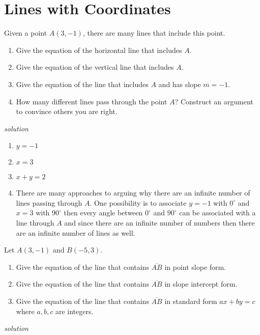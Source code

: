 \documentclass{amsbook}
\begin{document}
\section{Lines with Coordinates}
\begin{Exercise}[title={A point $(x,y)$} ,difficulty=0 ,label=3a1 ]
Given a point $A(3,-1)$, there are many lines that include this point.
	\begin{enumerate}
		\item Give the equation of the horizontal line that includes $A$.
		\item Give the equation of the vertical line that includes $A$.
		\item Give the equation of the line that includes $A$ and has slope $m=-1$.
		\item How many different lines pass through the point $A$? Construct an argument to convince others you are right.
	\end{enumerate}
\hfill \emph{solution} 
\end{Exercise}
\begin{Answer}[ref={3a1}]
 	\begin{enumerate}
 		\item $y=-1$
 		\item $x=3$
 		\item $x+y=2$
 		\item There are many approaches to arguing why there are an infinite number of lines passing through $A$. One possibility is to associate $y=-1$ with $0^\circ$ and $x=3$ with $90^\circ$ then every angle between $0^\circ$ and $90^\circ$ can be associated with a line through $A$ and since there are an infinite number of numbers then there are an infinite number of lines as well.
 	\end{enumerate}
\end{Answer}

\begin{Exercise}[title={Two Points} ,difficulty=0 ,label=3a2 ]
	Let $A(3,-1)$ and $B(-5,3)$. 
		\begin{enumerate}
			\item Give the equation of the line that contains $\overline{AB}$ in point slope form.
			\item Give the equation of the line that contains $\overline{AB}$ in slope intercept form.
			\item Give the equation of the line that contains $\overline{AB}$ in standard form $ax+by=c$ where $a,b,c$ are integers.
		\end{enumerate}
\hfill \emph{solution} 
\end{Exercise}
\begin{Answer}[ref={3a2}]
\end{Answer}
\end{document}
